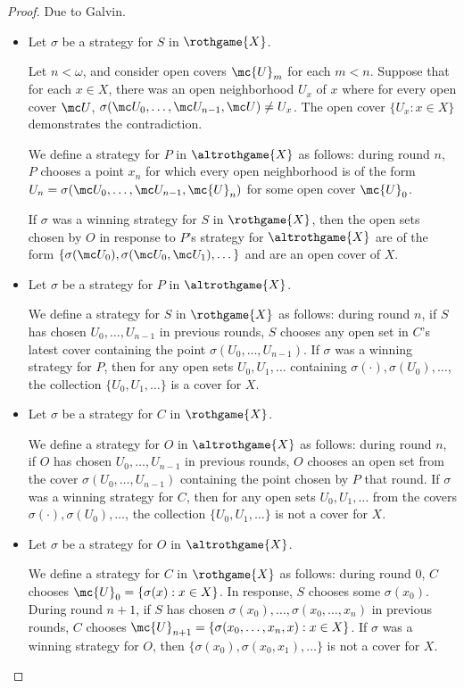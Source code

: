   \begin{proof}
    Due to Galvin.

    \begin{itemize}
      \item
      Let $\sigma$ be a strategy for $S$ in $\rothgame{X}$. 

      Let $n<\omega$, and consider open covers $\mc{U}_m$ for each $m<n$. Suppose that for each $x\in X$, there was an open neighborhood $U_x$ of $x$ where for every open cover $\mc U$, $\sigma(\mc U_0,\dots,\mc U_{n-1},\mc U)\not=U_x$. The open cover $\{U_x : x\in X\}$ demonstrates the contradiction.

      We define a strategy for $P$ in $\altrothgame{X}$ as follows: during round $n$, $P$ chooses a point $x_n$ for which every open neighborhood is of the form $U_n = \sigma(\mc U_0,\dots,\mc U_{n-1},\mc{U}_n)$ for some open cover $\mc{U}_0$.

      If $\sigma$ was a winning strategy for $S$ in $\rothgame{X}$, then the open sets chosen by $O$ in response to $P$'s strategy for $\altrothgame{X}$ are of the form $\{\sigma(\mc U_0),\sigma(\mc U_0,\mc U_1),\dots\}$ and are an open cover of $X$.

      \item
      Let $\sigma$ be a strategy for $P$ in $\altrothgame{X}$.

      We define a strategy for $S$ in $\rothgame{X}$ as follows: during round $n$, if $S$ has chosen $U_0,\dots,U_{n-1}$ in previous rounds, $S$ chooses any open set in $C$'s latest cover containing the point $\sigma(U_0,\dots,U_{n-1})$. If $\sigma$ was a winning strategy for $P$, then for any open sets $U_0,U_1,\dots$ containing $\sigma(\cdot),\sigma(U_0),\dots$, the collection $\{U_0,U_1,\dots\}$ is a cover for $X$.

      \item
      Let $\sigma$ be a strategy for $C$ in $\rothgame{X}$.

      We define a strategy for $O$ in $\altrothgame{X}$ as follows: during round $n$, if $O$ has chosen $U_0,\dots,U_{n-1}$ in previous rounds, $O$ chooses an open set from the cover $\sigma(U_0,\dots,U_{n-1})$ containing the point chosen by $P$ that round. If $\sigma$ was a winning strategy for $C$, then for any open sets $U_0,U_1,\dots$ from the covers $\sigma(\cdot),\sigma(U_0),\dots$, the collection $\{U_0,U_1,\dots\}$ is not a cover for $X$.

      \item
      Let $\sigma$ be a strategy for $O$ in $\altrothgame{X}$.

      We define a strategy for $C$ in $\rothgame{X}$ as follows: during round $0$, $C$ chooses $\mc{U}_0 = \{\sigma(x) : x\in X\}$. In response, $S$ chooses some $\sigma(x_0)$. During round $n+1$, if $S$ has chosen $\sigma(x_0),\dots,\sigma(x_0,\dots,x_n)$ in previous rounds, $C$ chooses $\mc{U}_{n+1} = \{\sigma(x_0,\dots,x_n,x) : x\in X\}$. If $\sigma$ was a winning strategy for $O$, then $\{\sigma(x_0),\sigma(x_0,x_1),\dots\}$ is not a cover for $X$.

    \end{itemize}
  \end{proof}

